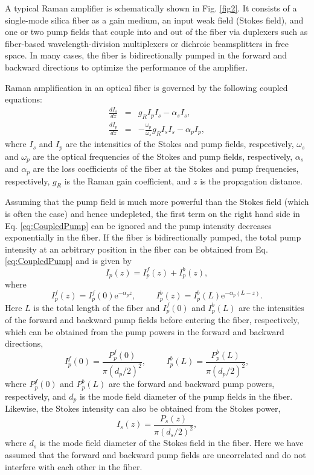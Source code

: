 \documentclass[10pt,letterpaper]{article}
\begin{document}
A typical Raman amplifier is schematically shown in Fig. \ref{fig2}. It consists of a single-mode silica fiber as a gain medium, an input weak field (Stokes field), and one or two pump fields that couple into and out of the fiber via duplexers such as fiber-based wavelength-division multiplexers or dichroic beamsplitters in free space. In many cases, the fiber is bidirectionally pumped in the forward and backward directions to optimize the performance of the amplifier. 

Raman amplification in an optical fiber is governed by the following coupled equations:
\begin{eqnarray}
\frac{dI_s}{dz} &=& g_R I_p I_s - \alpha_s I_s, \label{eq:CoupledStokes} \\
\frac{dI_p}{dz} &=& -\frac{\omega_p}{\omega_s} g_R I_s I_s- \alpha_p I_p, \label{eq:CoupledPump}
\end{eqnarray}
where $I_s$ and $I_p$ are the intensities of the Stokes and pump fields, respectively, $\omega_s$ and $\omega_p$ are the optical frequencies of the Stokes and pump fields, respectively, $\alpha_s$ and $\alpha_p$ are the loss coefficients of the fiber at the Stokes and pump frequencies, respectively, $g_R$ is the Raman gain coefficient, and $z$ is the propagation distance. 

Assuming that the pump field is much more powerful than the Stokes field (which is often the case) and hence undepleted, the first term on the right hand side in Eq. \ref{eq:CoupledPump} can be ignored and the pump intensity decreases exponentially in the fiber. If the fiber is bidirectionally pumped, the total pump intensity at an arbitrary position in the fiber can be obtained from Eq. \ref{eq:CoupledPump} and is given by 
\begin{equation}
I_p(z) = I_{p}^f(z) + I_{p}^b(z), 
\label{eq:PumpIntensity}
\end{equation}
where 
\begin{equation}
I_p^f(z) = I_{p}^f(0) \mathrm{e}^{-\alpha_p z}, \hspace{1cm}
I_p^b(z) = I_{p}^b(L) \mathrm{e}^{-\alpha_p (L-z)}. 
\end{equation}
Here $L$ is the total length of the fiber and $I_{p}^f(0)$ and $I_{p}^b(L)$ are the intensities of the forward and backward pump fields before entering the fiber, respectively, which can be obtained from the pump powers in the forward and backward directions,
\begin{equation}
I_{p}^{f}(0) = \frac{P_{p}^{f}(0)}{\pi(d_p/2)^2}, \hspace{1cm}
I_{p}^{b}(L) = \frac{P_{p}^{b}(L)}{\pi(d_p/2)^2},
\end{equation}
where $P_{p}^{f}(0)$ and $P_{p}^{b}(L)$ are the forward and backward pump powers, respectively, and $d_p$ is the mode field diameter of the pump fields in the fiber. Likewise, the Stokes intensity can also be obtained from the Stokes power,
\begin{equation}
I_s(z) = \frac{P_s(z)}{\pi(d_s/2)^2},
\end{equation}
where $d_s$ is the mode field diameter of the Stokes field in the fiber. Here we have assumed that the forward and backward pump fields are uncorrelated and do not interfere with each other in the fiber. 
\end{document}
